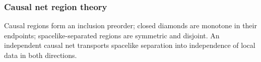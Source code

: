 \subsubsection{Causal net region theory}

\begin{theorem}\label{thm:causal-net}\leanok{}
Causal regions form an inclusion preorder; closed diamonds are monotone in
their endpoints; spacelike-separated regions are symmetric and disjoint. An
independent causal net transports spacelike separation into independence of
local data in both directions.
\end{theorem}
